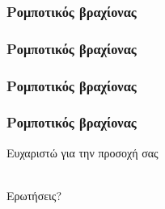 \documentclass{beamer}
\begin{document}
    \begin{frame}
        \frametitle{Ρομποτικός βραχίονας}
        
    \end{frame}
    
    \begin{frame}
        \frametitle{Ρομποτικός βραχίονας}
        
    \end{frame}
    
    \begin{frame}
        \frametitle{Ρομποτικός βραχίονας}
        
    \end{frame}
        
    \begin{frame}
        \frametitle{Ρομποτικός βραχίονας}
        
    \end{frame}
    
    \appendix
    
    \begin{frame}[plain,c]
        \begin{center}
            Ευχαριστώ για την προσοχή σας\\~\
            
            \pause
            \LARGE Ερωτήσεις?
        \end{center}
    \end{frame}
\end{document}

